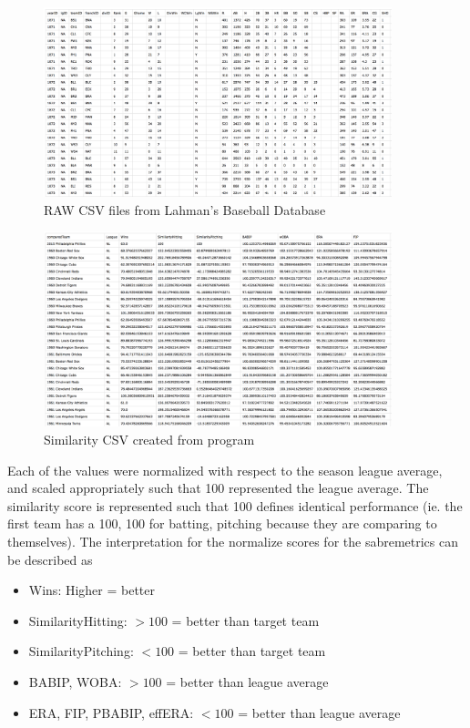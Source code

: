 \documentclass[12pt]{article}
\numberwithin{equation}{subsection}
\begin{document}
\begin{figure}[H]
	\centering
	\includegraphics[width=0.9\textwidth]{python1}
    \caption{RAW CSV files from Lahman's Baseball Database}
\end{figure}

\begin{figure}[H]
	\centering
	\includegraphics[width=0.9\textwidth]{python2}
    \caption{Similarity CSV created from program}
\end{figure}

Each of the values were normalized with respect to the season league average, and scaled appropriately such that 100 represented the league average. The similarity score is represented such that 100 defines identical performance (ie. the first team has a 100, 100 for batting, pitching because they are comparing to themselves). The interpretation for the normalize scores for the sabremetrics can be described as

\begin{itemize}
	\item Wins: Higher = better
	\item SimilarityHitting: $>100$ = better than target team
    \item SimilarityPitching: $<100$ = better than target team
    \item BABIP, WOBA: $>100$ = better than league average
    \item ERA, FIP, PBABIP, effERA: $<100$ = better than league average 
\end{itemize}
\end{document}
